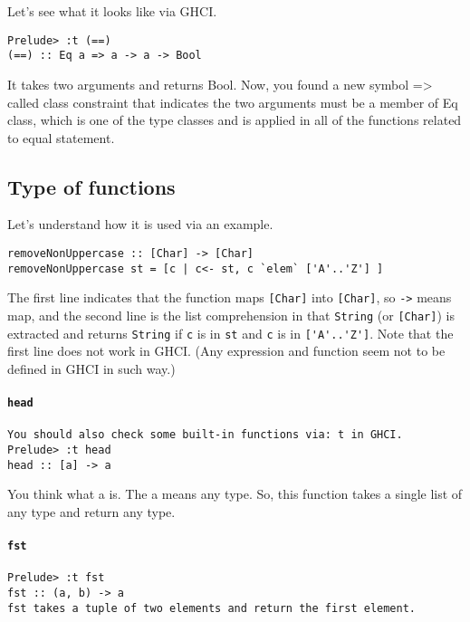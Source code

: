 Let’s see what it looks like via GHCI.
\begin{lstlisting}
Prelude> :t (==)
(==) :: Eq a => a -> a -> Bool
\end{lstlisting}

It takes two arguments and returns Bool. Now, you found a new symbol => called class constraint that indicates the two arguments must be a member of Eq class, which is one of the type classes and is applied in all of the functions related to equal statement.

\subsection{Type of functions}
Let’s understand how it is used via an example.
\begin{lstlisting}
removeNonUppercase :: [Char] -> [Char]
removeNonUppercase st = [c | c<- st, c `elem` ['A'..'Z'] ]
\end{lstlisting}

The first line indicates that the function maps \lstinline{[Char]} into \lstinline{[Char]}, 
so \lstinline{->} means map, 
and the second line is the list comprehension in that \lstinline{String} (or \lstinline{[Char]}) is extracted and returns \lstinline{String} if \lstinline{c} is in \lstinline{st} and \lstinline{c} is in \lstinline{['A'..'Z']}. 
Note that the first line does not work in GHCI. 
(Any expression and function seem not to be defined in GHCI in such way.)

\paragraph{\lstinline{head} }

\begin{lstlisting}
You should also check some built-in functions via: t in GHCI.
Prelude> :t head
head :: [a] -> a
\end{lstlisting}

You think what a is. The a means any type. So, this function takes a single list of any type and return any type.

\paragraph{\lstinline{fst}}

\begin{lstlisting}
Prelude> :t fst
fst :: (a, b) -> a
fst takes a tuple of two elements and return the first element.
\end{lstlisting}

